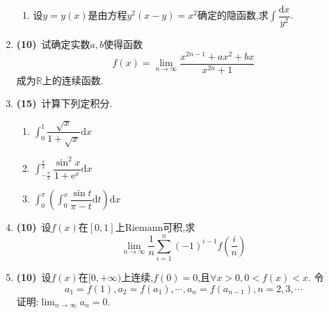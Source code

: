 \documentclass{ctexart}
\newcommand{\e}{\mathrm{e}}
\newcommand{\di}{\mathrm{d}}
\newcommand{\R}{\mathbb{R}}
\newcommand{\dx}{\di x}
\begin{document}
\begin{enumerate}[leftmargin=*,label=\textbf{\arabic*.}]
\begin{enumerate}[label=\textbf{(\arabic*)}]
            \item 设$y=y(x)$是由方程$y^2(x-y)=x^2$确定的隐函数,求$\displaystyle\int{\dfrac{\dx}{y^2}}$.
        \end{enumerate}
    \item \textbf{(10)}\ 试确定实数$a,b$使得函数$$f(x)=\lim_{n\to\infty}{\dfrac{x^{2n-1}+ax^2+bx}{x^{2n}+1}}$$成为$\R$上的连续函数.
    \item \textbf{(15)}\ 计算下列定积分.
        \begin{enumerate}[label=\textbf{(\arabic*)}]
            \item $\displaystyle\int_0^1\dfrac{\sqrt{x}}{1+\sqrt{x}}\dx$
            \item $\displaystyle\int_{-\frac{\pi}{2}}^{\frac{\pi}{2}}\dfrac{\sin^2x}{1+\e^x}\dx$
            \item $\displaystyle\int_{0}^{\pi}\left(\int_{0}^{x}\dfrac{\sin t}{\pi-t}\di t\right)\dx$
        \end{enumerate}
    \item \textbf{(10)}\ 设$f(x)$在$[0,1]$上Riemann可积,求$$\lim_{n\to\infty}\dfrac{1}{n}\sum_{i=1}^{n}(-1)^{i-1}f\left(\dfrac{i}{n}\right)$$
    \item \textbf{(10)}\ 设$f(x)$在$[0,+\infty)$上连续,$f(0)=0$,且$\forall x>0,0<f(x)<x$.
        令$$a_1=f(1),a_2=f(a_1),\cdots,a_n=f(a_{n-1}),n=2,3,\cdots$$
        证明:$\displaystyle\lim_{n\to\infty}a_n=0$.
\end{enumerate}
\end{document}
